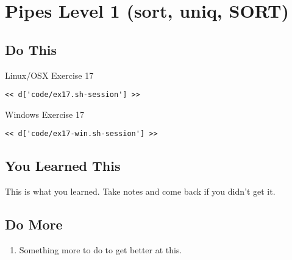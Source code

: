 \chapter{Pipes Level 1 (sort, uniq, SORT)}

\section{Do This}

\begin{code}{Linux/OSX Exercise 17}
\begin{Verbatim}
<< d['code/ex17.sh-session'] >>
\end{Verbatim}
\end{code}

\begin{code}{Windows Exercise 17}
\begin{Verbatim}
<< d['code/ex17-win.sh-session'] >>
\end{Verbatim}
\end{code}

\section{You Learned This}

This is what you learned.  Take notes and come back if you didn't get it.

\section{Do More}

\begin{enumerate}
\item Something more to do to get better at this.
\end{enumerate}

